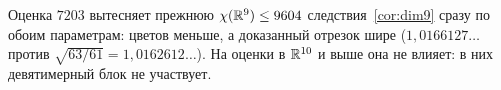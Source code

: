 \begin{remark}\label{rem:r9beats}
Оценка $7203$ вытесняет прежнюю $\chi(\mathbb{R}^9)\le9604$ следствия~\ref{cor:dim9}
сразу по обоим параметрам: цветов меньше, а доказанный отрезок шире
($1{,}0166127\ldots$ против $\sqrt{63/61}=1{,}0162612\ldots$). На оценки в
$\mathbb{R}^{10}$ и выше она не влияет: в них девятимерный блок не участвует.
\end{remark}
